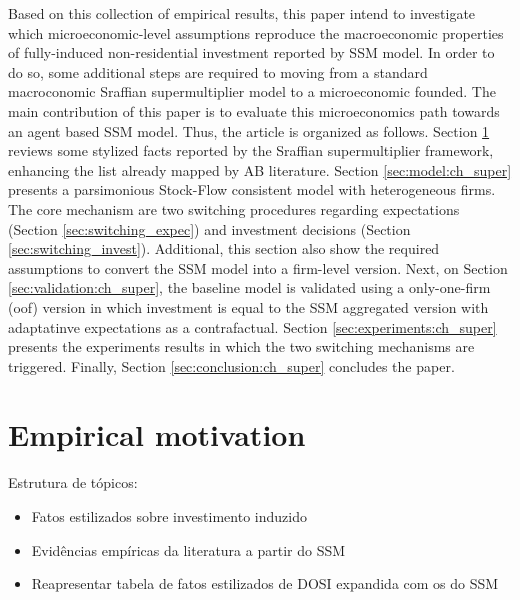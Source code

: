 \documentclass{SelfArx}
\begin{document}
Based on this collection of empirical results, this paper intend to investigate which microeconomic-level assumptions reproduce the macroeconomic properties of fully-induced non-residential investment reported by SSM model.
In order to do so, some additional steps are required to moving from a standard macroconomic Sraffian supermultiplier model to a microeconomic founded.
The main contribution of this paper is to evaluate this microeconomics path towards an agent based SSM model.
Thus, the article is organized as follows.
Section \ref{sec:empirical:ch_super} reviews some stylized facts reported by the Sraffian supermultiplier framework, enhancing the list already mapped by AB literature.
Section \ref{sec:model:ch_super} presents a parsimonious Stock-Flow consistent model with heterogeneous firms.
The core mechanism are two switching procedures regarding expectations (Section \ref{sec:switching_expec}) and investment decisions (Section \ref{sec:switching_invest}).
Additional, this section also show the required assumptions to convert the SSM model into a firm-level version.
Next, on Section \ref{sec:validation:ch_super}, the baseline model is validated using a only-one-firm (oof) version in which investment is equal to the SSM aggregated version with adaptatinve expectations as a contrafactual.
Section \ref{sec:experiments:ch_super} presents the experiments results in which the two switching mechanisms are triggered.
Finally, Section \ref{sec:conclusion:ch_super} concludes the paper.


\section{Empirical motivation}
\label{sec:empirical:ch_super}
Estrutura de tópicos:

\begin{itemize}
\item Fatos estilizados sobre investimento induzido
\item Evidências empíricas da literatura a partir do SSM
\item Reapresentar tabela de fatos estilizados de DOSI expandida com os do SSM
\end{itemize}
\end{document}
